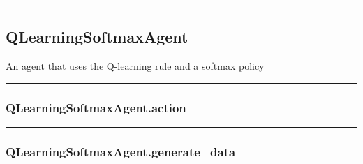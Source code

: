 \begin{center}\rule{0.5\linewidth}{\linethickness}\end{center}

\hypertarget{qlearningsoftmaxagent}{%
\subsection{QLearningSoftmaxAgent}\label{qlearningsoftmaxagent}}

\begin{Shaded}
\begin{Highlighting}[]
\end{Highlighting}
\end{Shaded}

An agent that uses the Q-learning rule and a softmax policy

\begin{center}\rule{0.5\linewidth}{\linethickness}\end{center}

\hypertarget{qlearningsoftmaxagent.action}{%
\subsubsection{QLearningSoftmaxAgent.action}\label{qlearningsoftmaxagent.action}}

\begin{Shaded}
\begin{Highlighting}[]
\end{Highlighting}
\end{Shaded}

\begin{center}\rule{0.5\linewidth}{\linethickness}\end{center}

\hypertarget{qlearningsoftmaxagent.generate_data}{%
\subsubsection{QLearningSoftmaxAgent.generate\_data}\label{qlearningsoftmaxagent.generate_data}}

\begin{Shaded}
\begin{Highlighting}[]
\end{Highlighting}
\end{Shaded}

